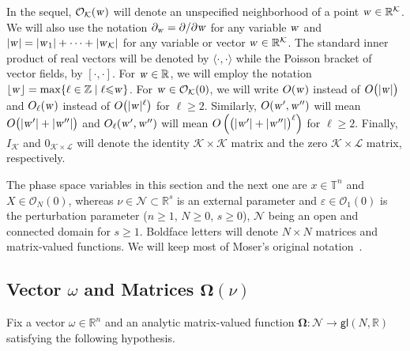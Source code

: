 \documentclass[12pt,reqno]{amsart}
\theoremstyle{definition}
\begin{document}
In the sequel, ${\mathcal O}_{\mathcal K}({\text{\textsl{w}}})$ will denote an unspecified neighborhood
of a point ${\text{\textsl{w}}}\in{\mathbb R}^{\mathcal K}$. We will also use the notation
$\partial_{\text{\textsl{w}}}=\partial/\partial{\text{\textsl{w}}}$ for any variable ${\text{\textsl{w}}}$ and
$|{\text{\textsl{w}}}|=|{\text{\textsl{w}}}_1|+\cdots+|{\text{\textsl{w}}}_{\mathcal K}|$ for any variable or vector
${\text{\textsl{w}}}\in{\mathbb R}^{\mathcal K}$. The standard inner product of real vectors will be denoted
by $\langle\cdot,\cdot\rangle$ while the Poisson bracket of vector fields, by
$[\cdot,\cdot]$. For ${\text{\textsl{w}}}\in{\mathbb R}$, we will employ the notation
$\lfloor{\text{\textsl{w}}}\rfloor=\max\{\ell\in{\mathbb Z} \mid \ell{\leqslant}{\text{\textsl{w}}}\}$. For
${\text{\textsl{w}}}\in{\mathcal O}_{\mathcal K}(0)$, we will write $O({\text{\textsl{w}}})$ instead of
$O\bigl(|{\text{\textsl{w}}}|\bigr)$ and $O_\ell({\text{\textsl{w}}})$ instead of $O\bigl(|{\text{\textsl{w}}}|^\ell\bigr)$
for $\ell{\geqslant} 2$. Similarly, $O({\text{\textsl{w}}}',{\text{\textsl{w}}}'')$ will mean
$O\bigl(|{\text{\textsl{w}}}'|+|{\text{\textsl{w}}}''|\bigr)$ and $O_\ell({\text{\textsl{w}}}',{\text{\textsl{w}}}'')$ will mean
$O\left(\bigl(|{\text{\textsl{w}}}'|+|{\text{\textsl{w}}}''|\bigr)^\ell\right)$ for $\ell{\geqslant} 2$. Finally,
$I_{\mathcal K}$ and $0_{{\mathcal K}\times{\mathcal L}}$ will denote the identity ${\mathcal K}\times{\mathcal K}$
matrix and the zero ${\mathcal K}\times{\mathcal L}$ matrix, respectively.

The phase space variables in this section and the next one are $x\in{\mathbb T}^n$ and
$X\in{\mathcal O}_N(0)$, whereas $\nu\in{\mathcal N}\subset{\mathbb R}^s$ is an external parameter and
${\varepsilon}\in{\mathcal O}_1(0)$ is the perturbation parameter ($n{\geqslant} 1$, $N{\geqslant} 0$,
$s{\geqslant} 0$), ${\mathcal N}$ being an open and connected domain for $s{\geqslant} 1$. Boldface
letters will denote $N\times N$ matrices and matrix-valued functions. We will
keep most of Moser's original notation~\cite{M67}.

\subsection{Vector $\omega$ and Matrices ${\mathbf{\Omega}}(\nu)$}\label{omega}

Fix a vector $\omega\in{\mathbb R}^n$ and an analytic matrix-valued function
${\mathbf{\Omega}}:{\mathcal N}\to{\mathsf{gl}}(N,{\mathbb R})$ satisfying the following hypothesis.
\end{document}
